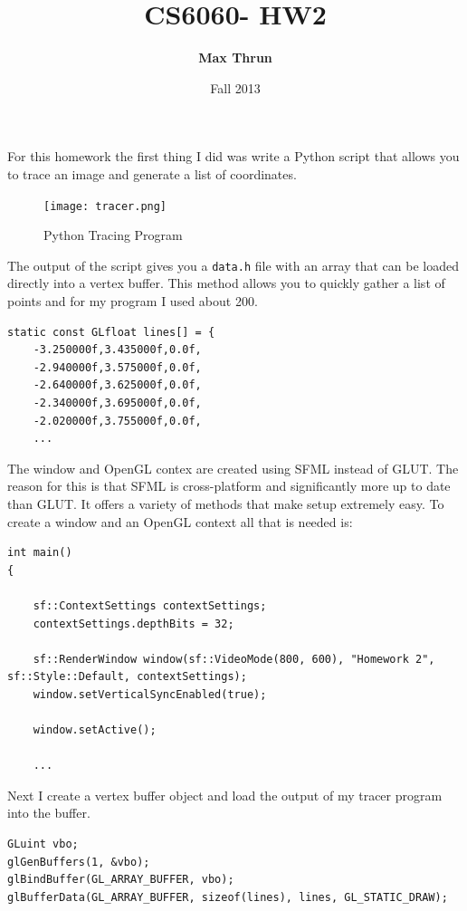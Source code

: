 \documentclass[12pt]{article}
\date{Fall 2013}
\title{
    \vspace{2in}
    \textmd{\textbf{CS6060- HW2}}\\
    \vspace{4in}
}
\author{\textbf{Max Thrun}}
\begin{document}
\maketitle
\newpage

For this homework the first thing I did was write a Python script that
allows you to trace an image and generate a list of coordinates.

\begin{figure}[H]
    \centering
    \texttt{[image: tracer.png]}
    \caption{Python Tracing Program}
\end{figure}

The output of the script gives you a \texttt{data.h} file with an array that
can be loaded directly into a vertex buffer. This method allows you to quickly
gather a list of points and for my program I used about 200.

\begin{lstlisting}[caption=Output of Python tracing program]
static const GLfloat lines[] = {
    -3.250000f,3.435000f,0.0f,
    -2.940000f,3.575000f,0.0f,
    -2.640000f,3.625000f,0.0f,
    -2.340000f,3.695000f,0.0f,
    -2.020000f,3.755000f,0.0f,
    ...
\end{lstlisting}

\newpage
The window and OpenGL contex are created using SFML instead of GLUT. The reason
for this is that SFML is cross-platform and significantly more up to date than
GLUT. It offers a variety of methods that make setup extremely easy. To create a window
and an OpenGL context all that is needed is:

\begin{lstlisting}[caption=Window Creation]
int main()
{

    sf::ContextSettings contextSettings;
    contextSettings.depthBits = 32;

    sf::RenderWindow window(sf::VideoMode(800, 600), "Homework 2", sf::Style::Default, contextSettings);
    window.setVerticalSyncEnabled(true);

    window.setActive();

    ...
\end{lstlisting}

Next I create a vertex buffer object and load the output of my tracer program
into the buffer.

\begin{lstlisting}[caption=Loading VBO]
GLuint vbo;
glGenBuffers(1, &vbo);
glBindBuffer(GL_ARRAY_BUFFER, vbo);
glBufferData(GL_ARRAY_BUFFER, sizeof(lines), lines, GL_STATIC_DRAW);
\end{lstlisting}
\end{document}
